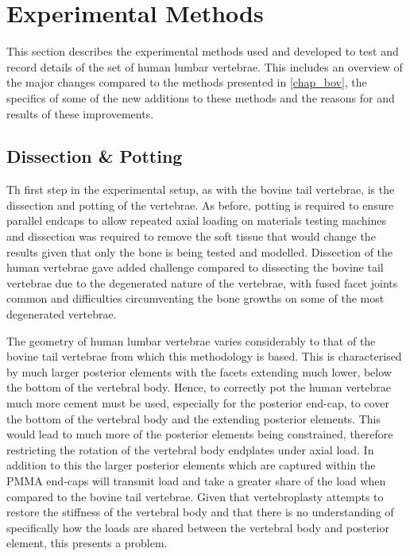 \section{Experimental Methods}

This section describes the experimental methods used and developed to test and
record details of the set of human lumbar vertebrae. This includes an overview
of the major changes compared to the methods presented in \cref{chap_bov}, the
specifics of some of the new additions to these methods and the reasons for and
results of these improvements.


\subsection{Dissection \& Potting}

Th first step in the experimental setup, as with the bovine tail vertebrae, is
the dissection and potting of the vertebrae. As before, potting is required to
ensure parallel endcaps to allow repeated axial loading on materials testing
machines and dissection was required to remove the soft tissue that would
change the results given that only the bone is being tested and modelled.
Dissection of the human vertebrae gave added challenge compared to dissecting
the bovine tail vertebrae due to the degenerated nature of the vertebrae, with
fused facet joints common and difficulties circumventing the bone growths on
some of the most degenerated vertebrae.

The geometry of human lumbar vertebrae varies considerably to that of the
bovine
tail vertebrae from which this methodology is based. This is characterised by
much larger posterior elements with the facets extending much lower, below the
bottom of the vertebral body. Hence, to correctly pot the human vertebrae much
more cement must be used, especially for the posterior end-cap, to
cover the bottom of the vertebral body and the extending posterior elements.
This would lead to much more of the posterior elements being constrained, therefore
restricting the rotation of the vertebral body endplates under axial load. In
addition to this the larger posterior elements which are captured within the
PMMA end-caps will transmit load and take a greater share of the load when
compared to the bovine tail vertebrae. Given that vertebroplasty attempts to
restore the stiffness of the vertebral body and that there is no understanding
of specifically how the loads are shared between the vertebral body and
posterior element, this presents a problem.

